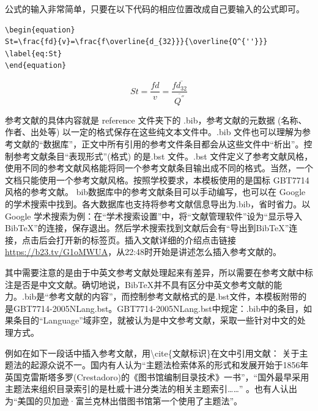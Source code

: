公式的输入非常简单，只要在以下代码的相应位置改成自己要输入的公式即可。
\begin{lstlisting}[caption={公式插入代码}]
\begin{equation}
St=\frac{fd}{v}=\frac{f\overline{d_{32}}}{\overline{Q^{''}}}
\label{eq:St}
\end{equation}
\end{lstlisting}
\begin{equation}
St=\frac{fd}{v}=\frac{f\overline{d_{32}}}{\overline{Q^{''}}}
\label{eq:St}
\end{equation}



参考文献的具体内容就是 reference 文件夹下的 .bib，参考文献的元数据 (名称、作者、出处等) 以一定的格式保存在这些纯文本文件中。.bib 文件也可以理解为参考文献的“数据库”，正文中所有引用的参考文件条目都会从这些文件中“析出”。控制参考文献条目“表现形式”(格式) 的是.bst 文件。.bst 文件定义了参考文献风格，使用不同的参考文献风格能将同一个参考文献条目输出成不同的格式。当然，一个文档只能使用一个参考文献风格。按照学校要求，本模板使用的是国标 GBT7714 风格的参考文献。
bib数据库中的参考文献条目可以手动编写，也可以在 Google 的学术搜索中找到。各大数据库也支持将参考文献信息导出为.bib，省时省力。以 Google 学术搜索为例：在“学术搜索设置”中，将“文献管理软件”设为“显示导入 BibTeX”的连接，保存退出。然后学术搜索找到文献后会有“导出到BibTeX”连接，点击后会打开新的标签页。插入文献详细的介绍点击链接\url{https://b23.tv/G1oMWUA}，从22:48时开始是讲述怎么插入参考文献的。\par
其中需要注意的是由于中英文参考文献处理起来有差异，所以需要在参考文献中标注是否是中文文献。确切地说，BibTeX并不具有区分中英文参考文献的能力。.bib是“参考文献的内容”，而控制参考文献格式的是.bst文件，本模板附带的是GBT7714-2005NLang.bst。GBT7714-2005NLang.bst中规定：.bib中的条目，如果条目的“Language”域非空，就被认为是中文参考文献，采取一些针对中文的处理方式。\par
例如在如下一段话中插入参考文献，用\textbackslash cite\{文献标识\}在文中引用文献：
关于主题法的起源众说不一。国内有人认为“主题法检索体系的形式和发展开始于1856年英国克雷斯塔多罗(Crestadoro)的《图书馆编制目录技术》一书”，“国外最早采用主题法来组织目录索引的是杜威十进分类法的相关主题索引……” \cite{Jiang2005Size}。也有人认出为“美国的贝加逊·富兰克林出借图书馆第一个使用了主题法”。

